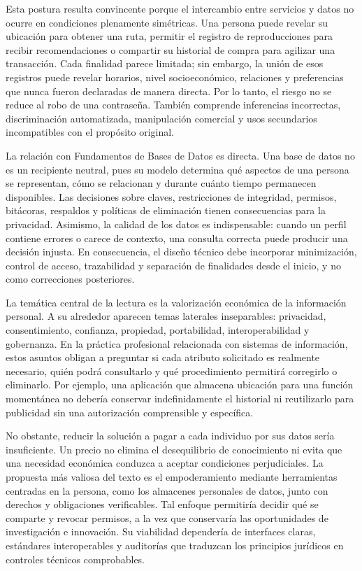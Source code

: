Esta postura resulta convincente porque el intercambio entre servicios y datos
no ocurre en condiciones plenamente simétricas. Una persona puede revelar su
ubicación para obtener una ruta, permitir el registro de reproducciones para
recibir recomendaciones o compartir su historial de compra para agilizar una
transacción. Cada finalidad parece limitada; sin embargo, la unión de esos
registros puede revelar horarios, nivel socioeconómico, relaciones y
preferencias que nunca fueron declaradas de manera directa. Por lo tanto, el
riesgo no se reduce al robo de una contraseña. También comprende inferencias
incorrectas, discriminación automatizada, manipulación comercial y usos
secundarios incompatibles con el propósito original.

La relación con Fundamentos de Bases de Datos es directa. Una base de datos no
es un recipiente neutral, pues su modelo determina qué aspectos de una persona
se representan, cómo se relacionan y durante cuánto tiempo permanecen
disponibles. Las decisiones sobre claves, restricciones de integridad,
permisos, bitácoras, respaldos y políticas de eliminación tienen consecuencias
para la privacidad. Asimismo, la calidad de los datos es indispensable: cuando
un perfil contiene errores o carece de contexto, una consulta correcta puede
producir una decisión injusta. En consecuencia, el diseño técnico debe incorporar
minimización, control de acceso, trazabilidad y separación de finalidades desde
el inicio, y no como correcciones posteriores.

La temática central de la lectura es la valorización económica de la información
personal. A su alrededor aparecen temas laterales inseparables: privacidad,
consentimiento, confianza, propiedad, portabilidad, interoperabilidad y
gobernanza. En la práctica profesional relacionada con sistemas de información,
estos asuntos obligan a preguntar si cada atributo solicitado es realmente
necesario, quién podrá consultarlo y qué procedimiento permitirá corregirlo o
eliminarlo. Por ejemplo, una aplicación que almacena ubicación para una función
momentánea no debería conservar indefinidamente el historial ni reutilizarlo
para publicidad sin una autorización comprensible y específica.

No obstante, reducir la solución a pagar a cada individuo por sus datos sería
insuficiente. Un precio no elimina el desequilibrio de conocimiento ni evita
que una necesidad económica conduzca a aceptar condiciones perjudiciales. La
propuesta más valiosa del texto es el empoderamiento mediante herramientas
centradas en la persona, como los almacenes personales de datos, junto con
derechos y obligaciones verificables. Tal enfoque permitiría decidir qué se
comparte y revocar permisos, a la vez que conservaría las oportunidades de
investigación e innovación. Su viabilidad dependería de interfaces claras,
estándares interoperables y auditorías que traduzcan los principios jurídicos en
controles técnicos comprobables.

